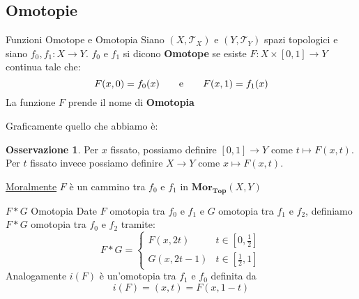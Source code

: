 \documentclass[11pt,a4paper,twoside]{article}
\theoremstyle{definition}
\newtheorem*{oss}{Osservazione}
\begin{document}
\subsection{Omotopie}

\begin{defn}{Funzioni Omotope e Omotopia}{}
	Siano $(X, \mathcal T_X)$ e $(Y, \mathcal T_Y)$ spazi topologici e siano $f_0, f_1 : X \to Y$. $f_0$ e $f_1$ si dicono \textbf{Omotope} se esiste $F:X \times [0,1] \to Y$ continua tale che:
	\[ F(x,0) = f_0(x)\qquad \text e \qquad F(x, 1) =f_1(x) \]
	La funzione $F$ prende il nome di \textbf{Omotopia}
\end{defn}

Graficamente quello che abbiamo è:
\begin{center}
\end{center}

\begin{oss}
	Per $x$ fissato, possiamo definire $[0,1] \to Y$ come $t \mapsto F(x, t)$.\\
	Per $t$ fissato invece possiamo definire $X \to Y$ come $x \mapsto F(x,t)$.
\end{oss}

\underline{Moralmente} $F$ è un cammino tra $f_0$ e $f_1$ in $\bm{Mor}_{\bm{Top}}(X, Y)$

\begin{defn}{$F*G$ Omotopia}{}
	Date $F$ omotopia tra $f_0$ e $f_1$ e $G$ omotopia tra $f_1$ e $f_2$, definiamo $F*G$ omotopia tra $f_0$ e $f_2$ tramite:
	\[ F*G = \begin{cases}
		F(x, 2t) & t \in [0,\frac 12]\\
		G(x, 2t-1) & t \in [\frac 12, 1]
	\end{cases}\]
	Analogamente $i(F)$ è un'omotopia tra $f_1$ e $f_0$ definita da
	\[ i(F) = (x,t) = F(x, 1-t) \]
\end{defn}
\end{document}
